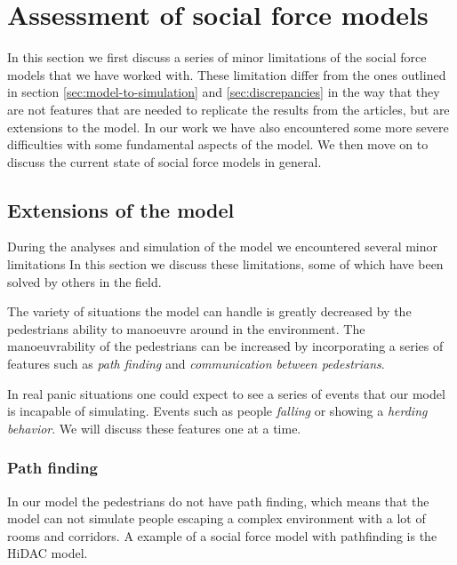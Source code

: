 \section{Assessment of social force models}
\label{sec:assessment}


In this section we first discuss a series of minor limitations of the social force models 
that we have worked with. These limitation differ from the ones outlined in 
section \ref{sec:model-to-simulation} and \ref{sec:discrepancies} in the way that 
they are not features that are needed to replicate the results from the articles, 
but are extensions to the model.
In our work we have also encountered some more severe difficulties with some 
fundamental aspects of the model.
We then move on to discuss the current state of social force models in general. 

\subsection{Extensions of the model}
During the analyses and simulation of the model we encountered several minor limitations 
In this section we discuss these limitations, some of which have been solved by others in the 
field. 

The variety of situations the model can handle is greatly decreased by the 
pedestrians ability to manoeuvre around in the environment. The manoeuvrability of 
the pedestrians can be increased by incorporating a series of features such as 
\emph{path finding} and \emph{communication between pedestrians}. 

In real panic situations one could expect to see a series of events that our 
model is incapable of simulating. Events such as people \emph{falling} or showing a 
\emph{herding behavior}. We will discuss these features one at a time.

\subsubsection{Path finding}
In our model the pedestrians do not have path finding, which means that the model 
can not simulate people escaping a complex environment with a lot of rooms 
and corridors. A example of a social force model with pathfinding is the HiDAC 
model\cite{HiDAC}.

